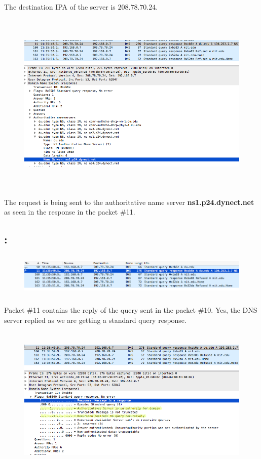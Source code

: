 \documentclass[]{report}
\begin{document}
The destination IPA of the server is $208.78.70.24$. 

\begin{figure}[H]
	\vspace{0pt}
	\includegraphics[height = 250pt, keepaspectratio]{Snapshots/q2/2_1_2.png}
\end{figure}

The request is being sent to the authoritative name server \textbf{ns1.p24.dynect.net} as seen in the response in the packet \#11. 

\subsection{:}

\begin{figure}[H]
	\vspace{0pt}
	\includegraphics[height = 60pt, keepaspectratio]{Snapshots/q2/2_2_1.png}
\end{figure}

Packet \#11 contains the reply of the query sent in the packet \#10. Yes, the DNS server replied as we are getting a standard query response. 

\begin{figure}[H]
	\vspace{0pt}
	\includegraphics[height = 200pt, keepaspectratio]{Snapshots/q2/2_2_2.png}
\end{figure}
\end{document}

